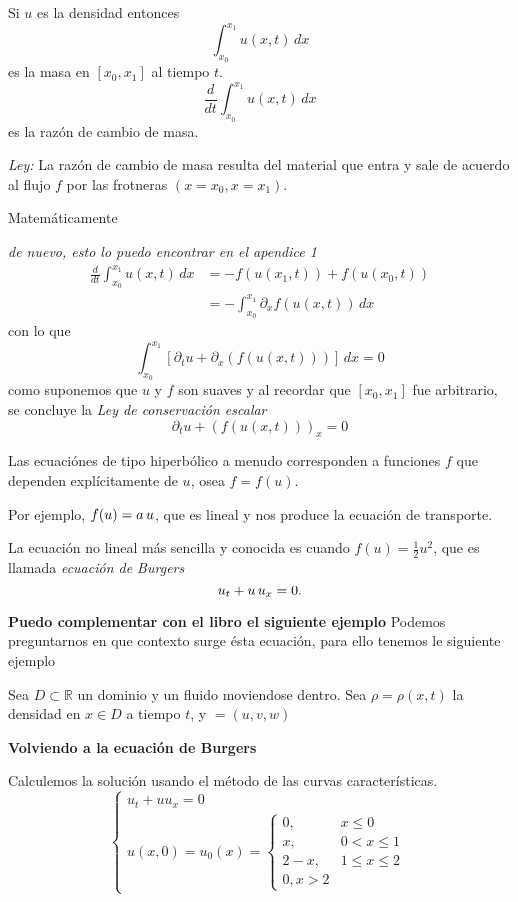 Si $u$ es la densidad entonces
\[
\int_{x_0}^{x_1} u(x,t) \,dx
\]
es la masa en $[x_0, x_1]$ al tiempo $t$.
\[
\frac{d}{dt} \int_{x_0}^{x_1} u(x,t) \,dx
\]
es la razón de cambio de masa.

\textit{Ley: } La razón de cambio de masa resulta del material que entra y sale de acuerdo al flujo $f$ por las frotneras $(x=x_0, x=x_1)$.

Matemáticamente

\textit{de nuevo, esto lo puedo encontrar en el apendice 1}
\begin{align*}
\frac{d}{dt} \int_{x_0}^{x_1} u(x,t) \,dx &= -f(u(x_1,t)) + f(u(x_0, t)) \\
			&= - \int_{x_0}^{x_1} \partial_x f(u(x,t)) \,dx	
\end{align*}
con lo que
\[
\int_{x_0}^{x_1} \left[ \partial_t u + \partial_x(f(u(x,t))) \right] \,dx = 0
\]
como suponemos que $u$ y $f$ son suaves y al recordar que $[x_0, x_1]$ fue arbitrario, se concluye la \textit{Ley de conservación escalar}
\[
\partial_t u + (f(u(x,t)))_x = 0
\]

Las ecuaciónes de tipo hiperbólico a menudo corresponden a funciones $f$ que dependen explícitamente de $u$, osea $f = f(u)$.

Por ejemplo, $f(u) = a \thinspace u$, que es lineal y nos produce la ecuación de transporte.

La ecuación no lineal más sencilla y conocida es cuando $f(u) = \frac{1}{2} u^2$, que es llamada \textit{ecuación de Burgers}
\[
u_t + u \thinspace u_x = 0.
\]


\textbf{Puedo complementar con el libro el siguiente ejemplo}
Podemos preguntarnos en que contexto surge ésta ecuación, para ello tenemos le siguiente ejemplo

Sea $D \subset \mathbb{R}$ un dominio y un fluido moviendose dentro. Sea $\rho = \rho(x,t)$ la densidad en $x \in D$ a tiempo $t$, y $ = (u, v, w)$


\textbf{Volviendo a la ecuación de Burgers}

Calculemos la solución usando el método de las curvas características.
\[
\begin{cases}
u_t + u u_x = 0 \\
u(x,0) = u_0(x) = \begin{cases}
				  0, & x\leq0 \\
				  x, & 0<x\leq 1 \\
				  2-x, & 1\leq x \leq 2 \\
				  0, x>2
				  \end{cases}
\end{cases}
\]

